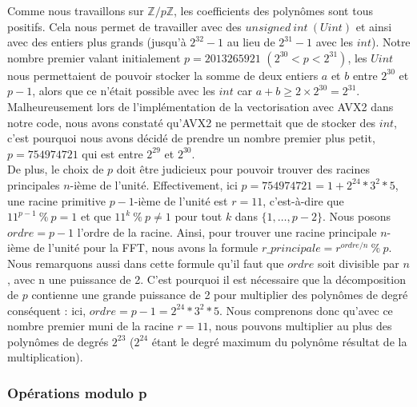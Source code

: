 \documentclass[12pt, a4paper]{article}
\begin{document}
Comme nous travaillons sur $\mathbb{Z}/p\mathbb{Z}$, les coefficients des polynômes sont tous positifs. Cela nous permet de travailler avec des $unsigned\ int\ (Uint)$ et ainsi avec des entiers plus grands (jusqu’à $2^{32}-1$ au lieu de $2^{31}-1$ avec les $int$). Notre nombre premier valant initialement $p=2013265921$ $(2^{30} < p < 2^{31})$, les $Uint$ nous permettaient de pouvoir stocker la somme de deux entiers $a$ et $b$ entre $2^{30}$ et $p-1$, alors que ce n'était possible avec les $int$ car $a+b\geq2\times2^{30}=2^{31}$. \\
\indent Malheureusement lors de l'implémentation de la vectorisation avec AVX2 dans notre code, nous avons constaté qu'AVX2 ne permettait que de stocker des $int$, c'est pourquoi nous avons décidé de prendre un nombre premier plus petit, $p=754974721$ qui est entre $2^{29}$ et  $2^{30}$. \\
\indent De plus, le choix de $p$ doit être judicieux pour pouvoir trouver des racines principales $n$-ième de l'unité. Effectivement, ici $p = 754974721 = 1+2^{24}*3^2*5$, une racine primitive $p-1$-ième de l'unité est $r = 11$, c'est-à-dire que $11^{p-1}\ \%\ p = 1$ et que $11^{k}\ \%\ p \ne 1$ pour tout $k$ dans $\{1,\dots,p-2\}$. Nous posons $ordre = p-1$ l'ordre de la racine. Ainsi, pour trouver une racine principale $n$-ième de l'unité pour la FFT, nous avons la formule $r\_principale = r^{ordre/n}\ \% \ p$. Nous remarquons aussi dans cette formule qu'il faut que $ordre$ soit divisible par $n$, avec n une puissance de 2. C'est pourquoi il est nécessaire que la décomposition de $p$ contienne une grande puissance de 2 pour multiplier des polynômes de degré conséquent : ici, $ordre = p-1 = 2^{24}*3^2*5$. Nous comprenons donc qu'avec ce nombre premier muni de la racine $r = 11$, nous pouvons multiplier au plus des polynômes de degrés $2^{23}$ ($2^{24}$ étant le degré maximum du polynôme résultat de la multiplication).

\subsubsection{Opérations modulo p}
\end{document}
